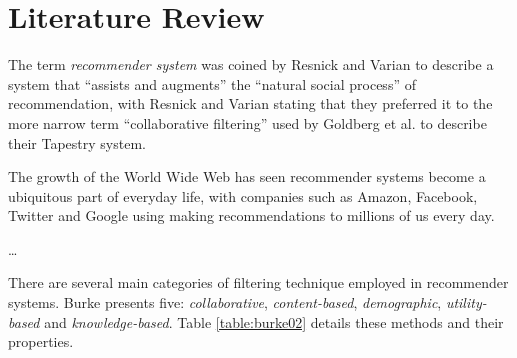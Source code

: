 \iffalse
Chapter 2: Literature Review and Context - the setting of the project in the context of other relevant work or theories or results. How this setting influenced the project.
\fi

\section{Literature Review}\label{literature review}

The term \textit{recommender system} was coined by Resnick and Varian \cite{Resnick97} to describe  a system that ``assists and augments'' the ``natural social process'' of recommendation, with Resnick and Varian stating that they preferred it to the more narrow term ``collaborative filtering'' used by Goldberg et al. \cite{Goldberg92}  to describe their Tapestry system.

The growth of the World Wide Web has seen recommender systems become a ubiquitous part of everyday life, with companies such as Amazon, Facebook, Twitter and Google using making recommendations to millions of us every day.

\ldots

There are several main categories of filtering technique employed in recommender systems. Burke \cite{Burke02} presents five: \textit{collaborative}, \textit{content-based}, \textit{demographic}, \textit{utility-based} and \textit{knowledge-based}. Table \ref{table:burke02} details these methods and their properties.

